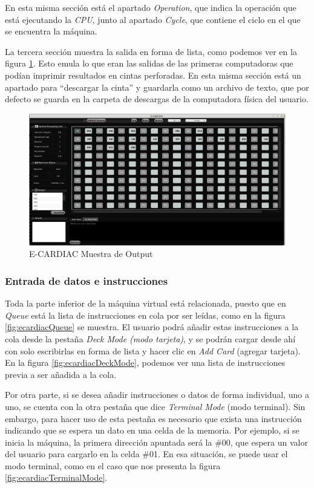 \documentclass[letterpaper,12pt,oneside]{book}
\begin{document}
	En esta misma sección está el apartado \textit{Operation}, que indica la operación que está ejecutando la \textit{CPU}, junto
	al apartado \textit{Cycle}, que contiene el ciclo en el que se encuentra la máquina.

  
 
	La tercera sección muestra la salida en forma de lista, como podemos ver en la figura \ref{fig:ecardiacOutput}. Esto emula lo que eran las salidas 
	de las primeras 
	computadoras que podían imprimir resultados
	en cintas perforadas. En esta misma sección está un apartado para ``descargar la cinta'' y guardarla
	como un archivo de texto, que por defecto se guarda en la carpeta de descargas de la computadora física del usuario.

	\begin{figure}[h]
 			\centering
			\includegraphics[scale=0.27]{media/ECARDIAC/OutputFullfilled.png}
			\caption{E-CARDIAC Muestra de Output}
			\label{fig:ecardiacOutput}
	\end{figure}

    \subsubsection{Entrada de datos e instrucciones}
 
	Toda la parte inferior de la máquina virtual está relacionada, puesto que en \textit{Queue} está la lista de instrucciones en cola por ser leídas, como en la figura \ref{fig:ecardiacQueue} se muestra. El usuario podrá añadir 
	estas instrucciones a la cola desde la pestaña \textit{Deck Mode (modo tarjeta)}, y se podrán cargar desde ahí con solo escribirlas
	en forma de lista y hacer clic en \textit{Add Card} (agregar tarjeta). En la figura \ref{fig:ecardiacDeckMode}, podemos ver una
	lista de instrucciones previa a ser añadida a la cola.
 
    Por otra parte, si se desea añadir instrucciones o datos de forma individual, uno a uno, se cuenta
	con la otra pestaña que dice \textit{Terminal Mode} (modo terminal). Sin embargo, para hacer uso
	de esta pestaña es necesario que exista una instrucción indicando que se espera un dato en una celda de la memoria. Por ejemplo, si se inicia la 
	máquina,
	la primera dirección apuntada será la \#00, que espera un valor del usuario para cargarlo
	en la celda \#01. En esa situación, se puede usar el modo terminal, como en el caso que nos presenta la figura \ref{fig:ecardiacTerminalMode}.
	
\end{document}
